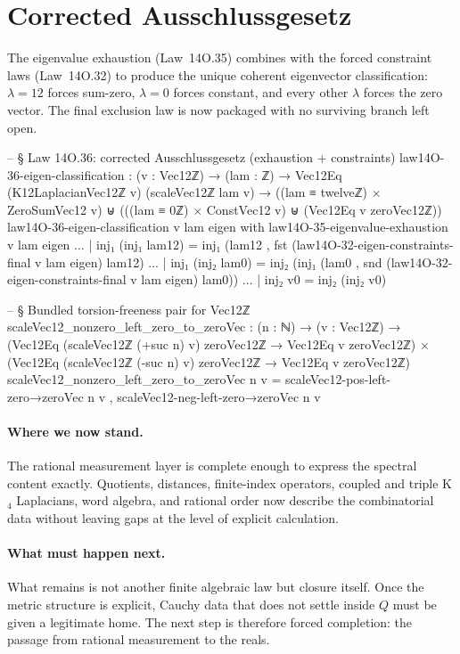\documentclass[11pt,a4paper]{book}
\def\mathbb#1{#1}%
\begin{document}
\section{Corrected Ausschlussgesetz}

The eigenvalue exhaustion (Law~14O.35) combines with the forced
constraint laws (Law~14O.32) to produce the unique coherent
eigenvector classification: $\lambda=12$ forces sum-zero,
$\lambda=0$ forces constant, and every other $\lambda$ forces
the zero vector.  The final exclusion law is now packaged with no
surviving branch left open.

\begin{code}
-- § Law 14O.36: corrected Ausschlussgesetz (exhaustion + constraints)
law14O-36-eigen-classification : (v : Vec12ℤ) → (lam : ℤ) →
  Vec12Eq (K12LaplacianVec12ℤ v) (scaleVec12ℤ lam v) →
  ((lam ≡ twelveℤ) × ZeroSumVec12 v) ⊎ (((lam ≡ 0ℤ) × ConstVec12 v) ⊎ (Vec12Eq v zeroVec12ℤ))
law14O-36-eigen-classification v lam eigen with law14O-35-eigenvalue-exhaustion v lam eigen
... | inj₁ (inj₁ lam12) =
  inj₁ (lam12 , fst (law14O-32-eigen-constraints-final v lam eigen) lam12)
... | inj₁ (inj₂ lam0) =
  inj₂ (inj₁ (lam0 , snd (law14O-32-eigen-constraints-final v lam eigen) lam0))
... | inj₂ v0 =
  inj₂ (inj₂ v0)

-- § Bundled torsion-freeness pair for Vec12ℤ
scaleVec12_nonzero_left_zero_to_zeroVec :
  (n : ℕ) → (v : Vec12ℤ) →
  (Vec12Eq (scaleVec12ℤ (+suc n) v) zeroVec12ℤ → Vec12Eq v zeroVec12ℤ)
  × (Vec12Eq (scaleVec12ℤ (-suc n) v) zeroVec12ℤ → Vec12Eq v zeroVec12ℤ)
scaleVec12_nonzero_left_zero_to_zeroVec n v =
  scaleVec12-pos-left-zero→zeroVec n v , scaleVec12-neg-left-zero→zeroVec n v
\end{code}

\paragraph{Where we now stand.}
The rational measurement layer is complete enough to express the spectral content exactly. Quotients, distances, finite-index operators, coupled and triple K$_4$ Laplacians, word algebra, and rational order now describe the combinatorial data without leaving gaps at the level of explicit calculation.

\paragraph{What must happen next.}
What remains is not another finite algebraic law but closure itself. Once the metric structure is explicit, Cauchy data that does not settle inside $\mathbb{Q}$ must be given a legitimate home. The next step is therefore forced completion: the passage from rational measurement to the reals.
\end{document}
